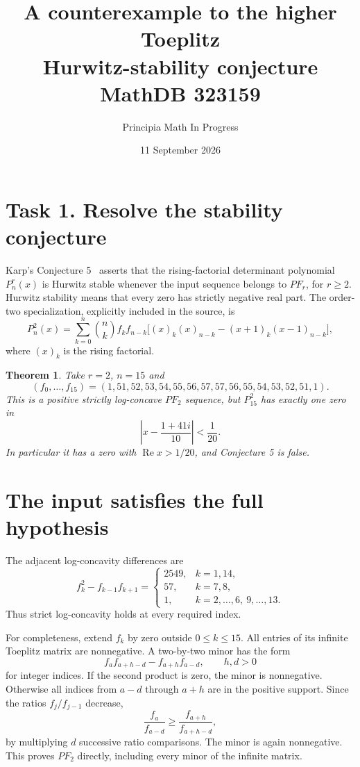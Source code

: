 \documentclass[10pt]{article}
\title{A counterexample to the higher Toeplitz\\
Hurwitz-stability conjecture\\\large MathDB 323159}
\author{Principia Math In Progress}
\date{11 September 2026}
\newtheorem{theorem}{Theorem}
\begin{document}
\maketitle

\section*{Task 1. Resolve the stability conjecture}

Karp's Conjecture 5~\cite{K} asserts that the rising-factorial determinant
polynomial $P_n^r(x)$ is Hurwitz stable whenever the input sequence belongs
to $PF_r$, for $r\geq2$. Hurwitz stability means that every zero has
strictly negative real part.
The order-two specialization, explicitly included in the source, is
\begin{equation}
 P_n^2(x)=\sum_{k=0}^n\binom nk f_kf_{n-k}
 \bigl[(x)_k(x)_{n-k}-(x+1)_k(x-1)_{n-k}\bigr],
 \label{eq:definition}
\end{equation}
where $(x)_k$ is the rising factorial.

\begin{theorem}
Take $r=2$, $n=15$ and
\[
 (f_0,\ldots,f_{15})=
 (1,51,52,53,54,55,56,57,57,56,55,54,53,52,51,1).
\]
This is a positive strictly log-concave $PF_2$ sequence, but $P_{15}^2$
has exactly one zero in
\[
 \left|x-\frac{1+41i}{10}\right|<\frac1{20}.
\]
In particular it has a zero with $\operatorname{Re}x>1/20$,
and Conjecture 5 is false.
\end{theorem}

\section*{The input satisfies the full hypothesis}

The adjacent log-concavity differences are
\[
 f_k^2-f_{k-1}f_{k+1}=
 \begin{cases}
 2549,&k=1,14,\\
 57,&k=7,8,\\
 1,&k=2,\ldots,6,\ 9,\ldots,13.
 \end{cases}
\]
Thus strict log-concavity holds at every required index.

For completeness, extend $f_k$ by zero outside $0\leq k\leq15$.
All entries of its infinite Toeplitz matrix are nonnegative.
A two-by-two minor has the form
\[
 f_a f_{a+h-d}-f_{a+h}f_{a-d},\qquad h,d>0
\]
for integer indices. If the second product is zero, the minor is
nonnegative. Otherwise all indices from $a-d$ through $a+h$
are in the positive support. Since the ratios $f_j/f_{j-1}$ decrease,
\[
 \frac{f_a}{f_{a-d}}
 \geq\frac{f_{a+h}}{f_{a+h-d}},
\]
by multiplying $d$ successive ratio comparisons.
The minor is again nonnegative. This proves $PF_2$ directly, including
every minor of the infinite matrix.
\end{document}
